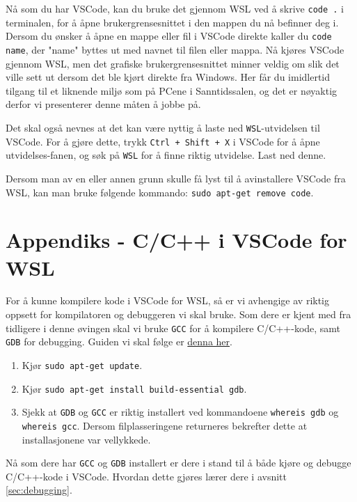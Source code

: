 Nå som du har VSCode, kan du bruke det gjennom WSL ved å skrive \verb|code .| i terminalen, for å åpne brukergrensesnittet i den mappen du nå befinner deg i. Dersom du ønsker å åpne en mappe eller fil i VSCode direkte kaller du \verb|code name|, der "name" byttes ut med navnet til filen eller mappa. Nå kjøres VSCode gjennom WSL, men det grafiske brukergrensesnittet minner veldig om slik det ville sett ut dersom det ble kjørt direkte fra Windows. Her får du imidlertid tilgang til et liknende miljø som på PCene i Sanntidssalen, og det er nøyaktig derfor vi presenterer denne måten å jobbe på.

Det skal også nevnes at det kan være nyttig å laste ned \verb|WSL|-utvidelsen til VSCode. For å gjøre dette, trykk \verb|Ctrl + Shift + X| i VSCode for å åpne utvidelses-fanen, og søk på \verb|WSL| for å finne riktig utvidelse. Last ned denne.

Dersom man av en eller annen grunn skulle få lyst til å avinstallere VSCode fra WSL, kan man bruke følgende kommando: \verb|sudo apt-get remove code|.

\section{Appendiks - C/C++ i VSCode for WSL}\label{app:C_VSCode_WSL}
For å kunne kompilere kode i VSCode for WSL, så er vi avhengige av riktig oppsett for kompilatoren og debuggeren vi skal bruke. Som dere er kjent med fra tidligere i denne øvingen skal vi bruke \verb|GCC| for å kompilere C/C++-kode, samt \verb|GDB| for debugging. Guiden vi skal følge er \href{https://code.visualstudio.com/docs/cpp/config-wsl}{denna her}.

\begin{enumerate}
    \item Kjør \verb|sudo apt-get update|.
    \item Kjør \verb|sudo apt-get install build-essential gdb|.
    \item Sjekk at \verb|GDB| og \verb|GCC| er riktig installert ved kommandoene \verb|whereis gdb| og \verb|whereis gcc|. Dersom filplasseringene returneres bekrefter dette at installasjonene var vellykkede.
\end{enumerate}

Nå som dere har \verb|GCC| og \verb|GDB| installert er dere i stand til å både kjøre og debugge C/C++-kode i VSCode. Hvordan dette gjøres lærer dere i avsnitt \ref{sec:debugging}.